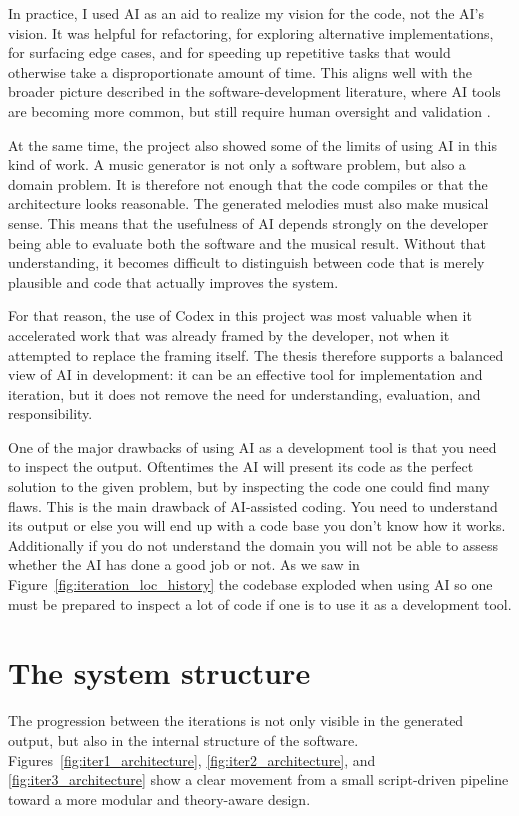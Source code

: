   In practice, I used \ac{AI} as an aid to realize my vision for the code, not the \ac{AI}'s vision.  It was helpful for refactoring, for exploring alternative implementations, for surfacing edge cases, and for speeding up repetitive tasks that would otherwise take a disproportionate amount of time. This aligns well with the broader picture described in the software-development literature, where \ac{AI} tools are becoming more common, but still require human oversight and validation \cite{wangInvestigatingDesigningTrust2023}.

  At the same time, the project also showed some of the limits of using \ac{AI} in this kind of work. A music generator is not only a software problem, but also a domain problem. It is therefore not enough that the code compiles or that the architecture looks reasonable. The generated melodies must also make musical sense. This means that the usefulness of \ac{AI} depends strongly on the developer being able to evaluate both the software and the musical result. Without that understanding, it becomes difficult to distinguish between code that is merely plausible and code that actually improves the system.

  For that reason, the use of Codex in this project was most valuable when it accelerated work that was already framed by the developer, not when it attempted to replace the framing itself. The thesis therefore supports a balanced view of \ac{AI} in development: it can be an effective tool for implementation and iteration, but it does not remove the need for understanding, evaluation, and responsibility.

  One of the major drawbacks of using \ac{AI} as a development tool is that you need to inspect the output. Oftentimes the \ac{AI} will present its code as the perfect solution to the given problem, but by inspecting the code one could find many flaws. This is the main drawback of \ac{AI}-assisted coding. You need to understand its output or else you will end up with a code base you don't know how it works. Additionally if you do not understand the domain you will not be able to assess whether the \ac{AI} has done a good job or not. As we saw in Figure~\ref{fig:iteration_loc_history} the codebase exploded when using \ac{AI} so one must be prepared to inspect a lot of code if one is to use it as a development tool.

\section{The system structure}
  The progression between the iterations is not only visible in the generated output, but also in the internal structure of the software. Figures~\ref{fig:iter1_architecture}, \ref{fig:iter2_architecture}, and \ref{fig:iter3_architecture} show a clear movement from a small script-driven pipeline toward a more modular and theory-aware design.

